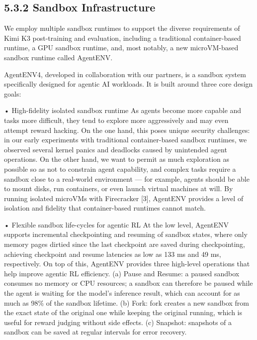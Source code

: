 \documentclass[
  10
]{article}
\begin{document}
\subsection{5.3.2 Sandbox Infrastructure}\label{sandbox-infrastructure}

We employ multiple sandbox runtimes to support the diverse requirements
of Kimi K3 post-training and evaluation, including a traditional
container-based runtime, a GPU sandbox runtime, and, most notably, a new
microVM-based sandbox runtime called AgentENV.

AgentENV4, developed in collaboration with our partners, is a sandbox
system specifically designed for agentic AI workloads. It is built
around three core design goals:

• High-fidelity isolated sandbox runtime As agents become more capable
and tasks more difficult, they tend to explore more aggressively and may
even attempt reward hacking. On the one hand, this poses unique security
challenges: in our early experiments with traditional container-based
sandbox runtimes, we observed several kernel panics and deadlocks caused
by unintended agent operations. On the other hand, we want to permit as
much exploration as possible so as not to constrain agent capability,
and complex tasks require a sandbox close to a real-world environment
--- for example, agents should be able to mount disks, run containers,
or even launch virtual machines at will. By running isolated microVMs
with Firecracker {[}3{]}, AgentENV provides a level of isolation and
fidelity that container-based runtimes cannot match.

• Flexible sandbox life-cycles for agentic RL At the low level, AgentENV
supports incremental checkpointing and resuming of sandbox states, where
only memory pages dirtied since the last checkpoint are saved during
checkpointing, achieving checkpoint and resume latencies as low as 133
ms and 49 ms, respectively. On top of this, AgentENV provides three
high-level operations that help improve agentic RL efficiency. (a) Pause
and Resume: a paused sandbox consumes no memory or CPU resources; a
sandbox can therefore be paused while the agent is waiting for the
model's inference result, which can account for as much as 98\% of the
sandbox lifetime. (b) Fork: fork creates a new sandbox from the exact
state of the original one while keeping the original running, which is
useful for reward judging without side effects. (c) Snapshot: snapshots
of a sandbox can be saved at regular intervals for error recovery.
\end{document}
